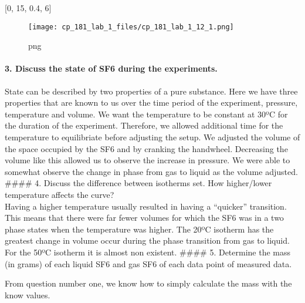 {[}0, 15, 0.4, 6{]}

\begin{figure}
\centering
\texttt{[image: cp\_181\_lab\_1\_files/cp\_181\_lab\_1\_12\_1.png]}
\caption{png}
\end{figure}

\hypertarget{discuss-the-state-of-sf6-during-the-experiments.}{%
\paragraph{3. Discuss the state of SF6 during the
experiments.}\label{discuss-the-state-of-sf6-during-the-experiments.}}

State can be described by two properties of a pure substance. Here we
have three properties that are known to us over the time period of the
experiment, pressure, temperature and volume. We want the temperature to
be constant at 30ºC for the duration of the experiment. Therefore, we
allowed additional time for the temperature to equilibriate before
adjusting the setup. We adjusted the volume of the space occupied by the
SF6 and by cranking the handwheel. Decreasing the volume like this
allowed us to observe the increase in pressure. We were able to somewhat
observe the change in phase from gas to liquid as the volume adjusted.
\#\#\#\# 4. Discuss the difference between isotherms set. How
higher/lower temperature affects the curve?\\
Having a higher temperature usually resulted in having a ``quicker''
transition. This means that there were far fewer volumes for which the
SF6 was in a two phase states when the temperature was higher. The 20ºC
isotherm has the greatest change in volume occur during the phase
transition from gas to liquid. For the 50ºC isotherm it is almost non
existent. \#\#\#\# 5. Determine the mass (in grams) of each liquid SF6
and gas SF6 of each data point of measured data.

From question number one, we know how to simply calculate the mass with
the know values.

\begin{Shaded}
\end{Shaded}

